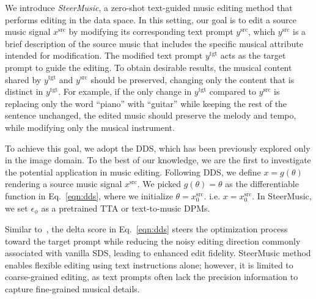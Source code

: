 We introduce \textit{SteerMusic}, a zero-shot text-guided music editing method that performs editing in the data space. In this setting, our goal is to edit a source music signal $x^{\text{src}}$ by modifying its corresponding text prompt $y^{\text{src}}$, which $y^{\text{src}}$ is a brief description of the source music that includes the specific musical attribute intended for modification. The modified text prompt $y^{\text{tgt}}$ acts as the target prompt to guide the editing.
To obtain desirable results, the musical content shared by $y^{\text{tgt}}$ and $y^{\text{src}}$ should be preserved, changing only the content that is distinct in $y^{\text{tgt}}$. For example, if the only change in $y^{\text{tgt}}$ compared to $y^{\text{src}}$ is replacing only the word ``piano'' with ``guitar'' while keeping the rest of the sentence unchanged, the edited music should preserve the melody and tempo, while modifying only the musical instrument.

To achieve this goal, we adopt the DDS, which has been previously explored only in the image domain. To the best of our knowledge, we are the first to investigate the potential application in music editing. Following DDS, we define $x = g(\theta)$ rendering a source music signal $x^{\text{src}}$. We picked $g(\theta)=\theta$ as the differentiable function in Eq.~\ref{eqn:dds}, where we initialize $\theta =x_0^{\text{src}}$. i.e. $x=x_0^{\text{src}}$. 
In SteerMusic, we set $\epsilon_\phi$ as a pretrained TTA or text-to-music DPMs.

Similar to~\citet{hertz2023delta}, the delta score in Eq.~\ref{eqn:dds} steers the optimization process toward the target prompt while reducing the noisy editing direction commonly associated with vanilla SDS, leading to enhanced edit fidelity.
SteerMusic method enables flexible editing using text instructions alone; however, it is limited to coarse-grained editing, as text prompts often lack the precision information to capture fine-grained musical details.

